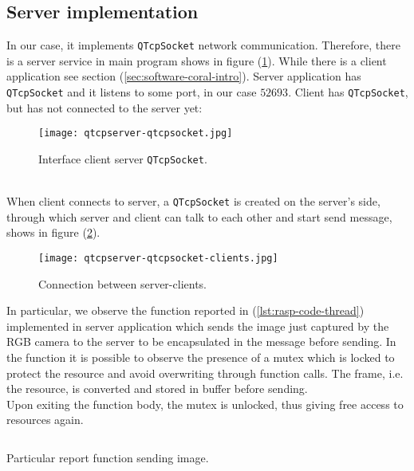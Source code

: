 \subsection{Server implementation}
\label{ssec:soft-rasp-server}
In our case, it implements \texttt{QTcpSocket} network communication.  
Therefore, there is a server service in main program shows in figure
(\ref{fig:software-socket-server}). 
While there is a client application see section (\ref{sec:software-coral-intro}). 
Server application has \texttt{QTcpSocket} and it listens to some port, in our
case $52693$. Client has \texttt{QTcpSocket}, but has not connected to the
server yet:\linebreak
%
%
\begin{figure}[!ht]
	\centering
	\texttt{[image: qtcpserver-qtcpsocket.jpg]}
	\caption{Interface client server \texttt{QTcpSocket}.}
	\label{fig:software-socket-server}
\end{figure}
%
\\When client connects to server, a \texttt{QTcpSocket} is created on the server’s
side, through which server and client can talk to each other and start send
message, shows in figure (\ref{fig:software-socket-server-client}).
%
%
\begin{figure}[htb]
	\centering
	\texttt{[image: qtcpserver-qtcpsocket-clients.jpg]}
	\caption{Connection between server-clients.}
	\label{fig:software-socket-server-client}
\end{figure}
%
In particular, we observe the function reported in (\ref{lst:rasp-code-thread})
implemented in server application which sends the image just captured by the RGB
camera to the server to be encapsulated in the message before sending. 
In the function it is possible to observe the presence of a mutex which is 
locked to protect the resource and avoid overwriting through function calls.
The frame, i.e. the resource, is converted and stored in buffer before
sending.\\ 
Upon exiting the function body, the mutex is unlocked, thus giving free
access to resources again.
\begin{listing}[ht]
\inputminted[frame=lines,framesep=2mm, linenos=true, autogobble, breaklines=true, fontsize=\scriptsize, firstline=84, lastline=95]{c++}{software/code/mainwindow.cpp} 
\caption{Particular report function sending image.} 
\label{lst:rasp-code-thread} 
\end{listing}
